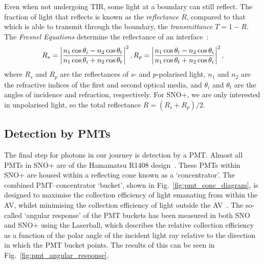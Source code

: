Even when not undergoing TIR, some light at a boundary can still reflect. The fraction of light that reflects is known as the \textit{reflectance} $R$, compared to that which is able to transmit through the boundary, the \textit{transmittance} $T=1-R$. The \textit{Fresnel Equations} determine the reflectance of an interface~\cite{}:%
\begin{equation}
    R_{s} = \left|\frac{n_{1}\cos{\theta_{i}}-n_{2}\cos{\theta_{t}}}{n_{1}\cos{\theta_{i}}+n_{2}\cos{\theta_{t}}}\right|^{2},\\
    R_{p} = \left|\frac{n_{1}\cos{\theta_{t}}-n_{2}\cos{\theta_{i}}}{n_{1}\cos{\theta_{t}}+n_{2}\cos{\theta_{i}}}\right|^{2},
\end{equation}
where $R_{s}$ and $R_{p}$ are the reflectances of $s$- and $p$-polarised light, $n_{1}$ and $n_{2}$ are the refractive indices of the first and second optical media, and $\theta_{i}$ and $\theta_{t}$ are the angles of incidence and refraction, respectively. For SNO+, we are only interested in unpolarised light, so the total reflectance $R = \left(R_{s}+R_{p}\right)/2$.

\subsection{Detection by PMTs}\label{sec:pmts}
The final step for photons in our journey is detection by a PMT. Almost all PMTs in SNO+ are of the Hamamatsu R1408 design~\cite{BOGER2000172}. %
These PMTs within SNO+ are housed within a reflecting cone known as a `concentrator'. The combined PMT--concentrator `bucket', shown in Fig.~\ref{fig:pmt_conc_diagram}, is designed to maximise the collection efficiency of light emanating from within the AV, whilst minimising the collection efficiency of light outside the AV~\cite{moorheadReflectorsCherenkovDetectors1992}. %
The so-called `angular response' of the PMT buckets has been measured in both SNO and SNO+ using the Laserball, which describes the relative collection efficiency as a function of the polar angle of the incident light ray relative to the direction in which the PMT bucket points. The results of this can be seen in Fig.~\ref{fig:pmt_angular_response}.

